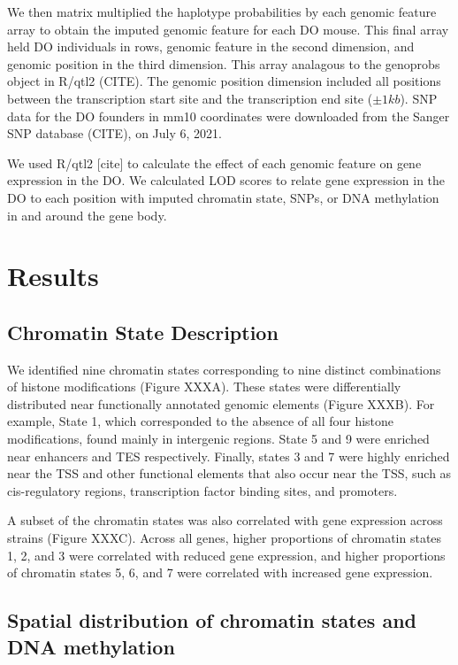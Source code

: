\documentclass[10pt,letterpaper]{article}
\begin{document}
We then matrix multiplied the haplotype probabilities by each genomic
feature array to obtain the imputed genomic feature for each DO mouse.
This final array held DO individuals in rows, genomic feature in the
second dimension, and genomic position in the third dimension. This
array analagous to the genoprobs object in R/qtl2 (CITE). The genomic
position dimension included all positions between the transcription
start site and the transcription end site (\(\pm 1kb\)). SNP data for
the DO founders in mm10 coordinates were downloaded from the Sanger SNP
database (CITE), on July 6, 2021.

We used R/qtl2 {[}cite{]} to calculate the effect of each genomic
feature on gene expression in the DO. We calculated LOD scores to relate
gene expression in the DO to each position with imputed chromatin state,
SNPs, or DNA methylation in and around the gene body.

\hypertarget{results}{%
\section{Results}\label{results}}

\hypertarget{chromatin-state-description}{%
\subsection{Chromatin State
Description}\label{chromatin-state-description}}

We identified nine chromatin states corresponding to nine distinct
combinations of histone modifications (Figure XXXA). These states were
differentially distributed near functionally annotated genomic elements
(Figure XXXB). For example, State 1, which corresponded to the absence
of all four histone modifications, found mainly in intergenic regions.
State 5 and 9 were enriched near enhancers and TES respectively.
Finally, states 3 and 7 were highly enriched near the TSS and other
functional elements that also occur near the TSS, such as cis-regulatory
regions, transcription factor binding sites, and promoters.

A subset of the chromatin states was also correlated with gene
expression across strains (Figure XXXC). Across all genes, higher
proportions of chromatin states 1, 2, and 3 were correlated with reduced
gene expression, and higher proportions of chromatin states 5, 6, and 7
were correlated with increased gene expression.

\hypertarget{spatial-distribution-of-chromatin-states-and-dna-methylation}{%
\subsection{Spatial distribution of chromatin states and DNA
methylation}\label{spatial-distribution-of-chromatin-states-and-dna-methylation}}
\end{document}
